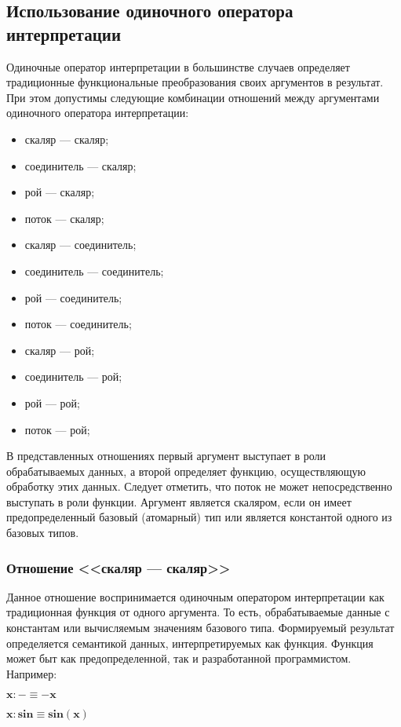 \subsection{Использование одиночного оператора интерпретации}

Одиночные оператор интерпретации в большинстве случаев определяет традиционные функциональные преобразования своих аргументов в результат. При этом допустимы следующие комбинации отношений между аргументами одиночного оператора интерпретации:
\begin{itemize}
	\item скаляр --- скаляр;
	\item соединитель --- скаляр;
	\item рой --- скаляр;
	\item поток --- скаляр;
	\item скаляр --- соединитель;
	\item соединитель --- соединитель;
	\item рой --- соединитель;
	\item поток --- соединитель;
	\item скаляр --- рой;
	\item соединитель --- рой;
	\item рой --- рой;
	\item поток --- рой;
\end{itemize}
В представленных отношениях первый аргумент выступает в роли обрабатываемых данных, а второй определяет функцию, осуществляющую обработку этих данных. Следует отметить, что поток не может непосредственно выступать в роли функции. Аргумент является скаляром, если он имеет предопределенный базовый (атомарный) тип или является константой одного из базовых типов.

\subsubsection{Отношение <<скаляр --- скаляр>>}

Данное отношение воспринимается одиночным оператором интерпретации как традиционная функция от одного аргумента. То есть, обрабатываемые данные с константам или вычисляемым значениям базового типа. Формируемый результат определяется семантикой данных, интерпретируемых как функция. Функция может быт как предопределенной, так и разработанной программистом. Например:
\begin{center}
	$\mathbf{x:- \equiv -x}$

	$\mathbf{x:sin \equiv sin(x)}$
\end{center}

